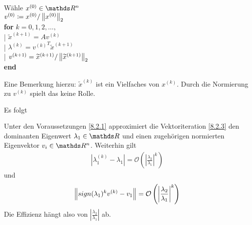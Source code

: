 \begin{pseudocode}{0.5\linewidth}
  Wähle $x^{(0)}\in\R^n$ \\
  $v^{(0)}\coloneqq x^{(0)}/\left\| x^{(0)} \right\|_2$ \\
  \textbf{for} $k=0,1,2,\ldots, $ \\
  |\> $\widetilde{x}^{(k+1)}= Av^{(k)}$ \\
  |\> $\lambda^{(k)} = {v^{(k)}}^T\widetilde{x}^{(k+1)}$ \\
  |\> $v^{(k+1)} = \widetilde{x}^{(k+1)}/\left\| \widetilde{x}^{(k+1)} \right\|_2$
  \\
  \textbf{end}
\end{pseudocode}

Eine Bemerkung hierzu:
$\widetilde{x}^{(k)}$ ist ein Vielfaches von $x^{(k)}$.
Durch die Normierung zu $v^{(k)}$ spielt das keine Rolle.

Es folgt

\begin{Satze}\label{8.2.4}
  Unter den Voraussetzungen \ref{8.2.1} approximiert
  die Vektoriteration \ref{8.2.3} den dominanten Eigenwert
  $\lambda_1\in\R$ und einen zugehörigen 
  normierten Eigenvektor $v_i\in\R^n$.
Weiterhin gilt
\begin{gather*}
  \left| \lambda_1^{(k)}-\lambda_1\right|
  =\mathcal{O}\left(\left|
        \frac{\lambda_2}{\lambda_1}
        \right|^k\right)
\end{gather*}
und
\begin{gather*}
  \left\| sign(\lambda_1)^k v^{(k)}-v_1 \right\|
  =\mathcal{O}\left( \left|
        \frac{\lambda_2}{\lambda_1}
        \right|^k \right)
\end{gather*}
Die Effizienz hängt also von 
$\left|\frac{\lambda_2}{\lambda_1}\right|$ ab.
\end{Satze}

